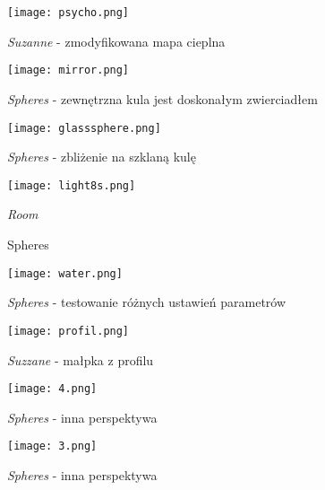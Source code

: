 \begin{figure}[htb!]
\centering
  \texttt{[image: psycho.png]}
  \caption{\emph{Suzanne} - zmodyfikowana mapa cieplna}
\end{figure}


\begin{figure}[htb!]
\centering
  \texttt{[image: mirror.png]}
  \caption{\emph{Spheres} - zewnętrzna kula jest doskonałym zwierciadłem}
\end{figure}


\begin{figure}[htb!]
\centering
  \texttt{[image: glasssphere.png]}
   \caption{\emph{Spheres} - zbliżenie na szklaną kulę}
\end{figure}

\begin{figure}[htb!]
\centering
  \texttt{[image: light8s.png]}
  \caption{\emph{Room}}
\end{figure}


\begin{figure}[htb!]
\centering
  \caption{Spheres}
  \texttt{[image: water.png]}
  \caption{\emph{Spheres} - testowanie różnych ustawień parametrów}
\end{figure}

\begin{figure}[htb!]
\centering
  \texttt{[image: profil.png]}
  \caption{\emph{Suzzane} - małpka z profilu}
\end{figure}

\begin{figure}[htb!]
\centering
  \texttt{[image: 4.png]}
  \caption{\emph{Spheres} - inna perspektywa}
\end{figure}

\begin{figure}[htb!]
\centering
  \texttt{[image: 3.png]}
  \caption{\emph{Spheres} - inna perspektywa}
\end{figure}


